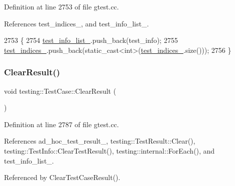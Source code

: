 Definition at line 2753 of file gtest.\+cc.



References test\+\_\+indices\+\_\+, and test\+\_\+info\+\_\+list\+\_\+.


\begin{DoxyCode}
2753                                                \{
2754   \hyperlink{classtesting_1_1TestCase_adce272a48399dd67a7bdd14fa7e99b80}{test\_info\_list\_}.push\_back(test\_info);
2755   \hyperlink{classtesting_1_1TestCase_a6bb04b98c46a3eecf7a4e6f62593a827}{test\_indices\_}.push\_back(static\_cast<int>(\hyperlink{classtesting_1_1TestCase_a6bb04b98c46a3eecf7a4e6f62593a827}{test\_indices\_}.size()));
2756 \}
\end{DoxyCode}
\mbox{\label{classtesting_1_1TestCase_a4d0498738f8903130a8d0400932e8b54}} 
\subsubsection{\texorpdfstring{Clear\+Result()}{ClearResult()}}
{\footnotesize\ttfamily void testing\+::\+Test\+Case\+::\+Clear\+Result (\begin{DoxyParamCaption}{ }\end{DoxyParamCaption})\hspace{0.3cm}{\ttfamily [private]}}



Definition at line 2787 of file gtest.\+cc.



References ad\+\_\+hoc\+\_\+test\+\_\+result\+\_\+, testing\+::\+Test\+Result\+::\+Clear(), testing\+::\+Test\+Info\+::\+Clear\+Test\+Result(), testing\+::internal\+::\+For\+Each(), and test\+\_\+info\+\_\+list\+\_\+.



Referenced by Clear\+Test\+Case\+Result().



